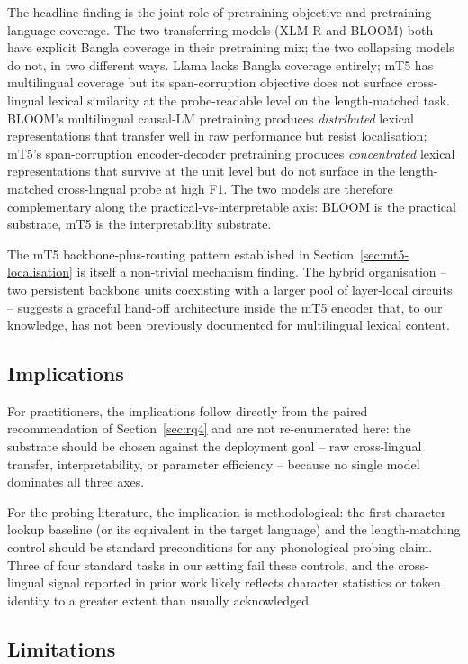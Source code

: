 The headline finding is the joint role of pretraining objective and pretraining language coverage. The two transferring models (XLM-R and BLOOM) both have explicit Bangla coverage in their pretraining mix; the two collapsing models do not, in two different ways. Llama lacks Bangla coverage entirely; mT5 has multilingual coverage but its span-corruption objective does not surface cross-lingual lexical similarity at the probe-readable level on the length-matched task. BLOOM's multilingual causal-LM pretraining produces \emph{distributed} lexical representations that transfer well in raw performance but resist localisation; mT5's span-corruption encoder-decoder pretraining produces \emph{concentrated} lexical representations that survive at the unit level but do not surface in the length-matched cross-lingual probe at high F1. The two models are therefore complementary along the practical-vs-interpretable axis: BLOOM is the practical substrate, mT5 is the interpretability substrate.

The mT5 backbone-plus-routing pattern established in Section~\ref{sec:mt5-localisation} is itself a non-trivial mechanism finding. The hybrid organisation -- two persistent backbone units coexisting with a larger pool of layer-local circuits -- suggests a graceful hand-off architecture inside the mT5 encoder that, to our knowledge, has not been previously documented for multilingual lexical content.

\subsection{Implications}

For practitioners, the implications follow directly from the paired recommendation of Section~\ref{sec:rq4} and are not re-enumerated here: the substrate should be chosen against the deployment goal -- raw cross-lingual transfer, interpretability, or parameter efficiency -- because no single model dominates all three axes.

For the probing literature, the implication is methodological: the first-character lookup baseline (or its equivalent in the target language) and the length-matching control should be standard preconditions for any phonological probing claim. Three of four standard tasks in our setting fail these controls, and the cross-lingual signal reported in prior work likely reflects character statistics or token identity to a greater extent than usually acknowledged.

\subsection{Limitations}
\label{sec:caveats}

